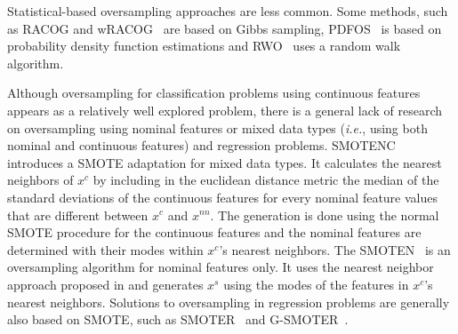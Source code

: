 \documentclass[parskip=full]{scrartcl}
\begin{document}
Statistical-based oversampling approaches are less common. Some methods, such
as RACOG and wRACOG~\cite{das2014racog} are based on Gibbs sampling,
PDFOS~\cite{gao2014pdfos} is based on probability density function
estimations and RWO~\cite{zhang2014rwo} uses a random walk algorithm.

Although oversampling for classification problems using continuous features
appears as a relatively well explored problem, there is a general lack of
research on oversampling using nominal features or mixed data types
(\textit{i.e.}, using both nominal and continuous features) and regression
problems. SMOTENC~\cite{chawla2002smote} introduces a SMOTE adaptation for
mixed data types. It calculates the nearest neighbors of $x^c$ by including in
the euclidean distance metric the median of the standard deviations of the
continuous features for every nominal feature values that are different
between $x^c$ and $x^{nn}$. The generation is done using the normal SMOTE
procedure for the continuous features and the nominal features are determined
with their modes within $x^c$'s nearest neighbors. The
SMOTEN~\cite{chawla2002smote} is an oversampling algorithm for nominal
features only. It uses the nearest neighbor approach proposed in
\citet{cost1993weighted} and generates $x^s$ using the modes of the features
in $x^c$'s nearest neighbors. Solutions to oversampling in regression problems
are generally also based on SMOTE, such as SMOTER~\cite{torgo2013smote} and
G-SMOTER~\cite{camacho2022geometric}.

% 
% 
% 
% 
% 
% 
\end{document}
